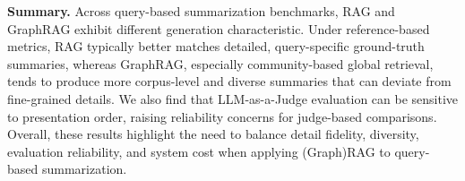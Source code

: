 \noindent\textbf{Summary.}
Across query-based summarization benchmarks, RAG and GraphRAG exhibit different generation characteristic. Under reference-based metrics, RAG typically better matches detailed, query-specific ground-truth summaries, whereas GraphRAG, especially community-based global retrieval, tends to produce more corpus-level and diverse summaries that can deviate from fine-grained details. We also find that LLM-as-a-Judge evaluation can be sensitive to presentation order, raising reliability concerns for judge-based comparisons. Overall, these results highlight the need to balance detail fidelity, diversity, evaluation reliability, and system cost when applying (Graph)RAG to query-based summarization.


